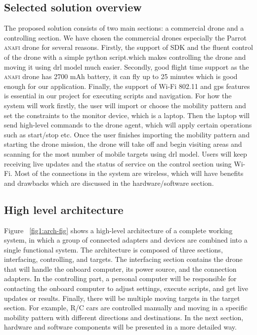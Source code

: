 \documentclass[../main.tex]{subfiles}
\begin{document}
    \subsection{Selected solution overview}
    The proposed solution consists of two main sections: a commercial drone and a controlling section.
    We have chosen the commercial drones especially the Parrot \textsc{anafi} drone for several reasons.
    Firstly, the support of SDK and the fluent control of the drone with a simple python script.which makes controlling the drone and moving it using \gls{drl} model much easier. 
    Secondly, good flight time support as the \textsc{anafi} drone has 2700 mAh battery, it can fly up to 25 minutes which is good enough for our application.
    Finally, the support of Wi-Fi 802.11 and \gls{gps} features is essential in our project for executing scripts and navigation. 
    For how the system will work firstly, the user will import or choose the mobility pattern and set the constraints to the monitor device, which is a laptop.
    Then the laptop will send high-level commands to the drone agent, which will apply certain operations such as start/stop etc.
    Once the user finishes importing the mobility pattern and starting the drone mission, the drone will take off and begin visiting areas and scanning for the most number of mobile targets using \gls{drl} model.
    Users will keep receiving live updates and the status of service on the control section using Wi-Fi.
    Most of the connections in the system are wireless, which will have benefits and drawbacks  which are discussed in the hardware/software section.

    \newpage
    \subsection{High level architecture}
    Figure ~\ref{fig1:arch-fig} shows a high-level architecture of a complete working system, in which a group of connected adapters and devices are combined into a single functional system. The architecture is composed of three sections, interfacing, controlling, and targets. The interfacing section contains the drone that will handle the onboard computer, its power source, and the connection adapters. In the controlling part, a personal computer will be responsible for contacting the onboard computer to adjust settings, execute scripts, and get live updates or results. Finally, there will be multiple moving targets in the target section. For example, R/C cars are controlled manually and moving in a specific mobility pattern with different directions and destinations. In the next section, hardware and software components will be presented in a more detailed way.
\end{document}
